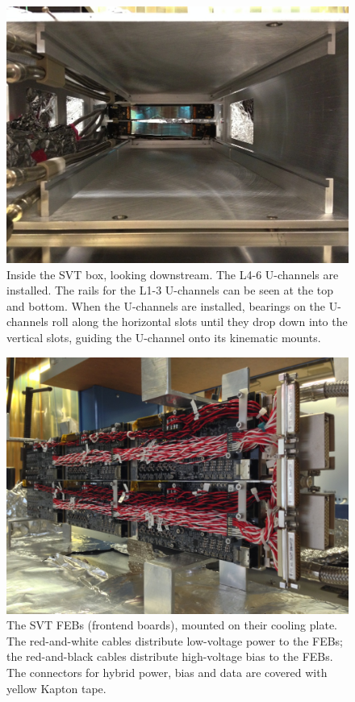 \begin{figure}[ht]
    \includegraphics[angle=90,width=\textwidth]{detector/figs/drawers}
    \caption{Inside the SVT box, looking downstream. The L4-6 U-channels are installed. The rails for the L1-3 U-channels can be seen at the top and bottom. When the U-channels are installed, bearings on the U-channels roll along the horizontal slots until they drop down into the vertical slots, guiding the U-channel onto its kinematic mounts.}
    \label{fig:drawers}
\end{figure}

\begin{figure}[ht]
    \includegraphics[width=\textwidth]{detector/figs/febplate}
    \caption{The SVT FEBs (frontend boards), mounted on their cooling plate. The red-and-white cables distribute low-voltage power to the FEBs; the red-and-black cables distribute high-voltage bias to the FEBs. The connectors for hybrid power, bias and data are covered with yellow Kapton tape.}
    \label{fig:febplate}
\end{figure}

